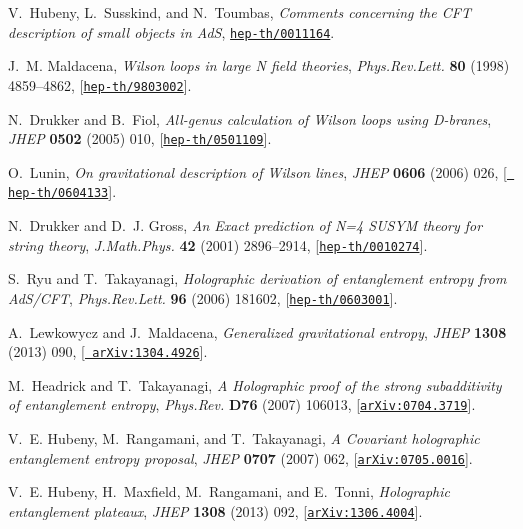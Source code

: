 \documentclass[12pt,a4paper]{article}
\begin{document}
\begin{thebibliography}{100}
V.~Hubeny, L.~Susskind, and N.~Toumbas, {\it {Comments concerning the CFT
  description of small objects in AdS}},
  \href{http://xxx.lanl.gov/abs/hep-th/0011164}{{\tt hep-th/0011164}}.

J.~M. Maldacena, {\it {Wilson loops in large N field theories}},  {\em
  Phys.Rev.Lett.} {\bf 80} (1998) 4859--4862,
  [\href{http://xxx.lanl.gov/abs/hep-th/9803002}{{\tt hep-th/9803002}}].

N.~Drukker and B.~Fiol, {\it {All-genus calculation of Wilson loops using
  D-branes}},  {\em JHEP} {\bf 0502} (2005) 010,
  [\href{http://xxx.lanl.gov/abs/hep-th/0501109}{{\tt hep-th/0501109}}].

O.~Lunin, {\it {On gravitational description of Wilson lines}},  {\em JHEP}
  {\bf 0606} (2006) 026, [\href{http://xxx.lanl.gov/abs/hep-th/0604133}{{\tt
  hep-th/0604133}}].

N.~Drukker and D.~J. Gross, {\it {An Exact prediction of N=4 SUSYM theory for
  string theory}},  {\em J.Math.Phys.} {\bf 42} (2001) 2896--2914,
  [\href{http://xxx.lanl.gov/abs/hep-th/0010274}{{\tt hep-th/0010274}}].

S.~Ryu and T.~Takayanagi, {\it {Holographic derivation of entanglement entropy
  from AdS/CFT}},  {\em Phys.Rev.Lett.} {\bf 96} (2006) 181602,
  [\href{http://xxx.lanl.gov/abs/hep-th/0603001}{{\tt hep-th/0603001}}].

A.~Lewkowycz and J.~Maldacena, {\it {Generalized gravitational entropy}},  {\em
  JHEP} {\bf 1308} (2013) 090, [\href{http://xxx.lanl.gov/abs/1304.4926}{{\tt
  arXiv:1304.4926}}].

M.~Headrick and T.~Takayanagi, {\it {A Holographic proof of the strong
  subadditivity of entanglement entropy}},  {\em Phys.Rev.} {\bf D76} (2007)
  106013, [\href{http://xxx.lanl.gov/abs/0704.3719}{{\tt arXiv:0704.3719}}].

V.~E. Hubeny, M.~Rangamani, and T.~Takayanagi, {\it {A Covariant holographic
  entanglement entropy proposal}},  {\em JHEP} {\bf 0707} (2007) 062,
  [\href{http://xxx.lanl.gov/abs/0705.0016}{{\tt arXiv:0705.0016}}].

V.~E. Hubeny, H.~Maxfield, M.~Rangamani, and E.~Tonni, {\it {Holographic
  entanglement plateaux}},  {\em JHEP} {\bf 1308} (2013) 092,
  [\href{http://xxx.lanl.gov/abs/1306.4004}{{\tt arXiv:1306.4004}}].


\end{thebibliography}
\end{document}
